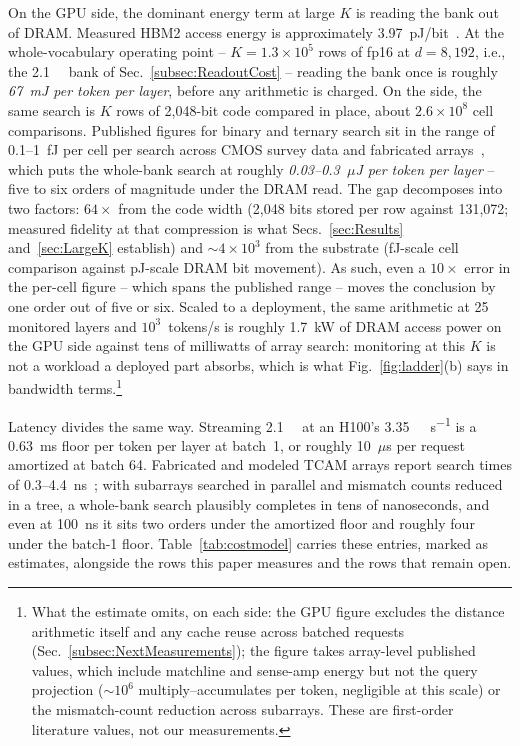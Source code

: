 On the GPU side, the dominant energy term at large $K$ is reading the
bank out of DRAM. Measured HBM2 access energy is approximately
3.97~pJ/bit~\cite{oconnor2017fgdram}. At the whole-vocabulary
operating point -- $K=1.3\!\times\!10^{5}$ rows of fp16 at $d=8{,}192$,
i.e., the \qty{2.1}{\giga\byte} bank of
Sec.~\ref{subsec:ReadoutCost} -- reading the bank once is roughly
\emph{67~mJ per token per layer}, before any arithmetic is charged. On
the \cam side, the same search is $K$ rows of 2{,}048-bit code compared
in place, about $2.6\!\times\!10^{8}$ cell comparisons. Published
figures for binary and ternary \cam search sit in the range of
0.1--1~fJ per cell per search across CMOS survey data and fabricated
\fefet arrays~\cite{pagiamtzis2006cam,ni2019fetcam,liu2022evacam},
which puts the whole-bank search at roughly \emph{0.03--0.3~$\mu$J per
token per layer} -- five to six orders of magnitude under the DRAM
read. The gap decomposes into two factors: $64\times$ from the code
width (2{,}048 bits stored per row against 131{,}072; measured
fidelity at that compression is what Secs.~\ref{sec:Results}
and~\ref{sec:LargeK} establish) and $\sim$$4\!\times\!10^{3}$ from the
substrate (fJ-scale cell comparison against pJ-scale DRAM bit
movement). As such, even a $10\times$ error in the per-cell figure --
which spans the published range -- moves the conclusion by one order
out of five or six. Scaled to a deployment, the same arithmetic at 25
monitored layers and $10^{3}$~tokens/s is roughly 1.7~kW of DRAM
access power on the GPU side against tens of milliwatts of array
search: monitoring at this $K$ is not a workload a deployed part
absorbs, which is what Fig.~\ref{fig:ladder}(b) says in bandwidth
terms.\footnote{What the estimate omits, on each side: the GPU figure
excludes the distance arithmetic itself and any cache reuse across
batched requests (Sec.~\ref{subsec:NextMeasurements}); the \cam figure
takes array-level published values, which include matchline and
sense-amp energy but not the query projection ($\sim$$10^{6}$
multiply--accumulates per token, negligible at this scale) or the
mismatch-count reduction across subarrays. These are first-order
literature values, not our measurements.}

Latency divides the same way. Streaming \qty{2.1}{\giga\byte} at an
H100's \qty{3.35}{\tera\byte\per\second} is a 0.63~ms floor per token
per layer at batch~1, or roughly 10~$\mu$s per request amortized at
batch 64. Fabricated and modeled TCAM arrays report search times of
0.3--4.4~ns~\cite{liu2022evacam,ni2019fetcam}; with subarrays searched
in parallel and mismatch counts reduced in a tree, a whole-bank search
plausibly completes in tens of nanoseconds, and even at 100~ns it sits
two orders under the amortized floor and roughly four under the
batch-1 floor. Table~\ref{tab:costmodel} carries these entries, marked
as estimates, alongside the rows this paper measures and the rows that
remain open.

